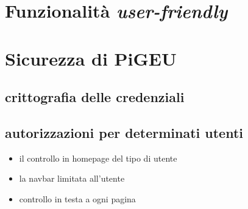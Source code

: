 \documentclass{article}
\begin{document}
\section{Funzionalità \textit{user-friendly}}
\section{Sicurezza di PiGEU}
\subsection{crittografia delle credenziali}
\subsection{autorizzazioni per determinati utenti}
\begin{itemize}
    \item il controllo in homepage del tipo di utente
    \item la navbar limitata all'utente
    \item controllo in testa a ogni pagina
\end{itemize}
\end{document}
